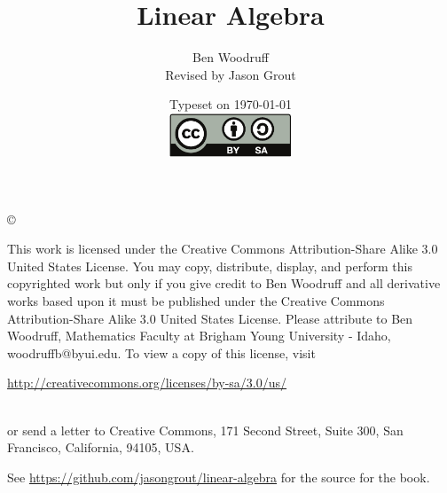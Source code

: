 \documentclass[letterpaper,oneside]{book}%
\theoremstyle{definition}
\theoremstyle{box}
\begin{document}
\frontmatter
\title{Linear Algebra}
\author{Ben Woodruff\\Revised by Jason Grout}
\date{Typeset on \today\\
\vfill
\includegraphics[height=1.3cm]{by-sa}
\vfill}
\maketitle
\copyright{This work is licensed under the Creative Commons
  Attribution-Share Alike 3.0 United States License.  You may copy,
  distribute, display, and perform this copyrighted work but only if
  you give credit to Ben Woodruff  and all derivative works based
  upon it must be published under the Creative Commons
  Attribution-Share Alike 3.0 United States License. Please attribute
  to Ben Woodruff, Mathematics Faculty at Brigham Young University -
  Idaho, woodruffb@byui.edu.  To view a copy of this license, visit\\
  \centerline{\url{http://creativecommons.org/licenses/by-sa/3.0/us/}}
  \\ or send a letter to Creative Commons, 171 Second Street, Suite
  300, San Francisco, California, 94105, USA.
\vfill 

See \url{https://github.com/jasongrout/linear-algebra} for the source for the book.
}
\tableofcontents



%

%
\end{document}

